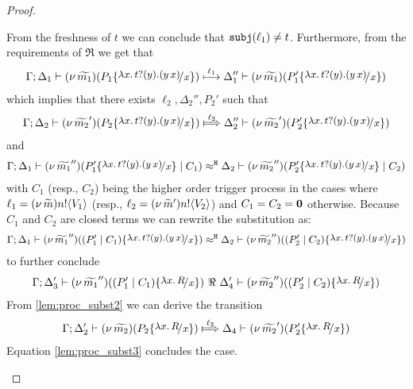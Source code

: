 \begin{proof}
\begin{enumerate}
				From the freshness of $t$ we can conclude that $\mathtt{subj}(\ell_1) \not= t$.
				Furthermore, from the requirements of $\Re$
				we get that
				\begin{eqnarray*}
					\horel{\Gamma}{\Delta_1}{\newsp{\widetilde{m_1}}{P_1 \subst{\trvalx{t}}{x} }}
					{\hby{\ell_1}}
					{\Delta_1''}{\newsp{\widetilde{m_1}}{P_1' \subst{\trvalx{t}}{x} }}
				\end{eqnarray*}
				which implies that there exists $\ell_2, \Delta_2'', P_2'$ such that
				\begin{eqnarray}
					\horel{\Gamma}{\Delta_2}{\newsp{\widetilde{m_2}'}{P_2 \subst{\trvalx{t}}{x} }}
					{\Hby{\ell_2}}
					{\Delta_2''}{\newsp{\widetilde{m_2}'}{P_2' \subst{\trvalx{t}}{x} }}
					\label{lem:proc_subst0}
				\end{eqnarray}
				and
				\begin{eqnarray*}
					\horel{\Gamma}{\Delta_1}{\newsp{\widetilde{m_1}''}{P_1' \subst{\trvalx{t}}{x} \Par C_1}}
					{\hwb}
					{\Delta_2}{\newsp{\widetilde{m_2}''}{P_2' \subst{\trvalx{t}}{x} \Par C_2}}
				\end{eqnarray*}
				with $C_1$ (resp., $C_2$) being the higher order trigger process
				in the cases where $\ell_1 = (\nu\, \widetilde{m}) n ! \langle V_1 \rangle$ (resp., $\ell_2 = (\nu\, \widetilde{m}') n ! \langle V_2 \rangle$)
				and $C_1 = C_2 = \mathbf{0}$ otherwise.
				Because $C_1$ and $C_2$ are closed terms we can rewrite the substitution as:
				\begin{eqnarray*}
					\horel{\Gamma}{\Delta_1}{\newsp{\widetilde{m_1}''}{(P_1'\Par C_1) \subst{\trvalx{t}}{x}}}
					{\hwb}
					{\Delta_2}{\newsp{\widetilde{m_2}''}{(P_2'\Par C_2) \subst{\trvalx{t}}{x}}}
				\end{eqnarray*}
				to further conclude 
				\begin{eqnarray}
					\horel{\Gamma}{\Delta_3'}{\newsp{\widetilde{m_1}''}{(P_1'\Par C_1) \subst{{\abs{x}{R}}}{x}}}
					{\ \Re\ }
					{\Delta_4'}{\newsp{\widetilde{m_2}''}{(P_2'\Par C_2) \subst{{\abs{x}{R}}}{x}}}
					\label{lem:proc_subst3}
				\end{eqnarray}
				From \eqref{lem:proc_subst2} we can derive the transition
				\begin{eqnarray*}
					\horel{\Gamma}{\Delta_2'}{\newsp{\widetilde{m_2}}{P_2 \subst{{\abs{x}{R}}}{x} }}
					{\Hby{\ell_2}}
					{\Delta_4}{\newsp{\widetilde{m_2}'}{P_2' \subst{{\abs{x}{R}}}{x} }}
				\end{eqnarray*}
				Equation \eqref{lem:proc_subst3} concludes the case.



\end{enumerate}
\end{proof}

